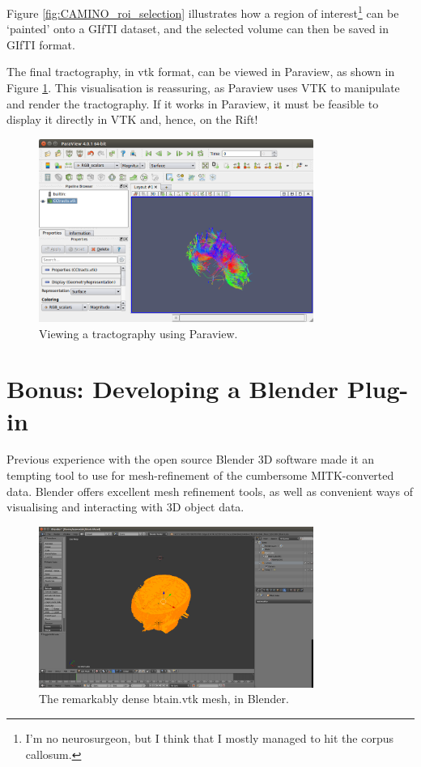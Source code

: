 \documentclass[MSc,paper=a4,pagesize=auto]{icldt}
\begin{document}
Figure \ref{fig:CAMINO_roi_selection} illustrates how a region of interest\footnote{I'm no neurosurgeon, but I think that I mostly managed to hit the corpus callosum.} can be `painted' onto a GIfTI dataset, and the selected volume can then be saved in GIfTI format.

The final tractography, in vtk format, can be viewed in Paraview, as shown in Figure \ref{fig:CAMINO_paraview}. This visualisation is reassuring, as Paraview uses VTK to manipulate and render the tractography. If it works in Paraview, it must be feasible to display it directly in VTK and, hence, on the Rift!

\begin{figure}[htbp!]
    \centering
    \includegraphics[width=0.8\textwidth]{resources/CAMINO_paraview}
    \caption{Viewing a tractography using Paraview.}
    \label{fig:CAMINO_paraview}
\end{figure}

\section{Bonus: Developing a Blender Plug-in}
Previous experience with the open source Blender 3D software made it an tempting tool to use for mesh-refinement of the cumbersome MITK-converted data. Blender offers excellent mesh refinement tools, as well as convenient ways of visualising and interacting with 3D object data.

\begin{figure}[htbp!]
    \centering
    \includegraphics[width=0.8\textwidth]{resources/blender_brain}
    \caption{The remarkably dense btain.vtk mesh, in Blender.}
    \label{fig:blender_brain}
\end{figure}
\end{document}
